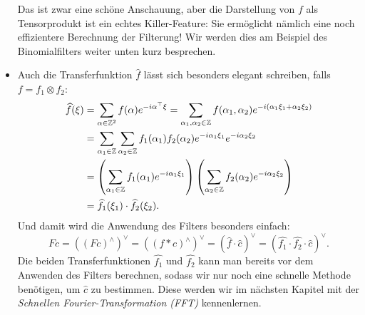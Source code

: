 \begin{remark}
\begin{itemize}
  Das ist zwar eine schöne Anschauung, aber die Darstellung von $ f $ als Tensorprodukt ist ein
  echtes Killer-Feature: Sie ermöglicht nämlich eine noch effizientere Berechnung der Filterung!
  Wir werden dies am Beispiel des Binomialfilters weiter unten kurz besprechen.
\item Auch die Transferfunktion $ \widehat{f} $ lässt sich besonders elegant schreiben, falls
  $ f = f_{1} \otimes f_{2} $:
  \begin{align*}
     \widehat{f}(\xi)
  &= \sum_{\alpha \in \mathbb{Z}^{2}} f(\alpha) e^{-i \alpha^{\top} \xi}
   = \sum_{\alpha_{1}, \alpha_{2} \in \mathbb{Z}} 
       f(\alpha_{1}, \alpha_{2}) e^{-i (\alpha_{1}\xi_{1} + \alpha_{2}\xi_{2})} \\
  &= \sum_{\alpha_{1} \in \mathbb{Z}} \sum_{\alpha_{2} \in \mathbb{Z}} 
        f_{1}(\alpha_{1}) f_{2}(\alpha_{2}) e^{-i\alpha_{1}\xi_{1}} e^{-i\alpha_{2}\xi_{2}} \\
  &= \left( \sum_{\alpha_{1} \in \mathbb{Z}} f_{1}(\alpha_{1}) e^{-i\alpha_{1}\xi_{1}} \right)
        \left( \sum_{\alpha_{2} \in \mathbb{Z}} f_{2}(\alpha_{2}) e^{-i\alpha_{2}\xi_{2}} \right) \\
  &= \widehat{f_{1}}(\xi_{1}) \cdot \widehat{f_{2}}(\xi_{2}).
  \end{align*}
  Und damit wird die Anwendung des Filters besonders einfach:
  \[
      Fc
    = \left( (Fc)^{\wedge} \right)^{\vee}
    = \left( (f * c)^{\wedge} \right)^{\vee}
    = \left( \widehat{f} \cdot \widehat{c} \right)^{\vee}
    = \left( \widehat{f_{1}} \cdot \widehat{f_{2}} \cdot \widehat{c} \right)^{\vee}.
  \]
  Die beiden Transferfunktionen $ \widehat{f_{1}} $ und $ \widehat{f_{2}} $ kann man bereits vor
  dem Anwenden des Filters berechnen, sodass wir nur noch eine schnelle Methode benötigen, um
  $ \widehat{c} $ zu bestimmen. Diese werden wir im nächsten Kapitel mit der \emph{Schnellen
  Fourier-Transformation (FFT)} kennenlernen.
\end{itemize}
\end{remark}

